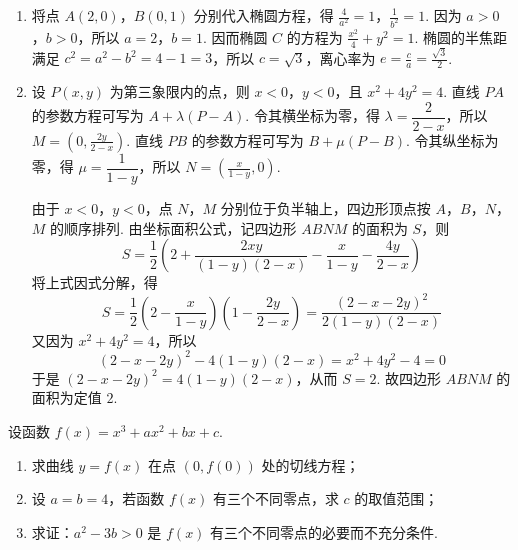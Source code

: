 \begin{solution}
\begin{enumerate}
\item 将点 \(A(2,0)\)，\(B(0,1)\) 分别代入椭圆方程，得 \(\frac{4}{a^2}=1\)，\(\frac{1}{b^2}=1\). 因为 \(a>0\)，\(b>0\)，所以 \(a=2\)，\(b=1\). 因而椭圆 \(C\) 的方程为 \(\frac{x^2}{4}+y^2=1\). 椭圆的半焦距满足 \(c^2=a^2-b^2=4-1=3\)，所以 \(c=\sqrt3\)，离心率为 \(e=\frac{c}{a}=\frac{\sqrt3}{2}\).

\item 设 \(P(x,y)\) 为第三象限内的点，则 \(x<0\)，\(y<0\)，且
\(x^2+4y^2=4\).
直线 \(PA\) 的参数方程可写为 \(A+\lambda(P-A)\). 令其横坐标为零，得 \(\lambda=\dfrac{2}{2-x}\)，所以 \(M=\left(0,\frac{2y}{2-x}\right)\).
直线 \(PB\) 的参数方程可写为 \(B+\mu(P-B)\). 令其纵坐标为零，得 \(\mu=\dfrac{1}{1-y}\)，所以 \(N=\left(\frac{x}{1-y},0\right)\).

由于 \(x<0\)，\(y<0\)，点 \(N\)，\(M\) 分别位于负半轴上，四边形顶点按 \(A\)，\(B\)，\(N\)，\(M\) 的顺序排列. 由坐标面积公式，记四边形 \(ABNM\) 的面积为 \(S\)，则
\[
S=\frac12\left(2+\frac{2xy}{(1-y)(2-x)}-\frac{x}{1-y}-\frac{4y}{2-x}\right)
\]
将上式因式分解，得
\[
S=\frac12\left(2-\frac{x}{1-y}\right)\left(1-\frac{2y}{2-x}\right)=\frac{(2-x-2y)^2}{2(1-y)(2-x)}
\]
又因为 \(x^2+4y^2=4\)，所以
\[
(2-x-2y)^2-4(1-y)(2-x)=x^2+4y^2-4=0
\]
于是 \((2-x-2y)^2=4(1-y)(2-x)\)，从而 \(S=2\).
故四边形 \(ABNM\) 的面积为定值 \(2\).
\end{enumerate}
\end{solution}

\begin{problem}
设函数 \(f(x)=x^3+ax^2+bx+c\).

\begin{enumerate}
\item 求曲线 \(y=f(x)\) 在点 \((0,f(0))\) 处的切线方程；
\item 设 \(a=b=4\)，若函数 \(f(x)\) 有三个不同零点，求 \(c\) 的取值范围；
\item 求证：\(a^2-3b>0\) 是 \(f(x)\) 有三个不同零点的必要而不充分条件.
\end{enumerate}
\end{problem}

